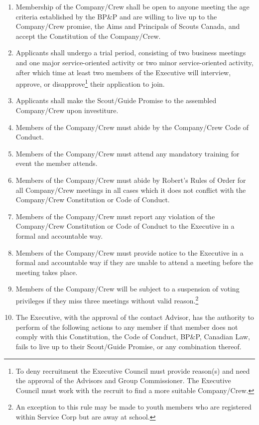 \begin{enumerate}
    \item Membership of the Company/Crew shall be open to anyone meeting the age criteria established by the BP\&P and are willing to live up to the Company/Crew promise, the Aims and Principals of Scouts Canada, and accept the Constitution of the Company/Crew.
    \item Applicants shall undergo a trial period, consisting of two business meetings and one major service-oriented activity or two minor service-oriented activity, after which time at least two members of the Executive will interview, approve, or disapprove\footnote{To deny recruitment the Executive Council must provide reason(s) and need the approval of the Advisors and Group Commissioner. The Executive Council must work with the recruit to find a more suitable Company/Crew.} their application to join.
    \item Applicants shall make the Scout/Guide Promise to the assembled Company/Crew upon investiture.
    \item Members of the Company/Crew must abide by the Company/Crew Code of Conduct.
    \item Members of the Company/Crew must attend any mandatory training for event the member attends.
    \item Members of the Company/Crew must abide by Robert's Rules of Order for all Company/Crew meetings in all cases which it does not conflict with the Company/Crew Constitution or Code of Conduct.
    \item Members of the Company/Crew must report any violation of the Company/Crew Constitution or Code of Conduct to the Executive in a formal and accountable way.
    \item Members of the Company/Crew must provide notice to the Executive in a formal and accountable way if they are unable to attend a meeting before the meeting takes place.
    \item Members of the Company/Crew will be subject to a suspension of voting privileges if they miss three meetings without valid reason.\footnote{An exception to this rule may be made to youth members who are registered within Service Corp but are away at school.}
    \item The Executive, with the approval of the contact Advisor, has the authority to perform of the following actions to any member if that member does not comply with this Constitution, the Code of Conduct, BP\&P, Canadian Law, fails to live up to their Scout/Guide Promise, or any combination thereof.

\end{enumerate}
